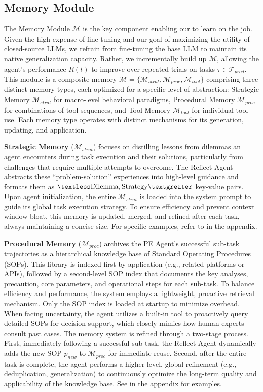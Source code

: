 \subsection{Memory Module}
\label{sec:memory}


The Memory Module $\mathcal{M}$ is the key component enabling our {\method} to learn on the job. 
{Given the high expense of fine-tuning and our goal of maximizing the utility of closed-source LLMs, we refrain from fine-tuning the base LLM to maintain its native generalization capacity. Rather, we incrementally build up $\mathcal{M}$, allowing the agent’s performance $R(t)$ to improve over repeated trials on tasks $\tau \in \mathcal{T}_{prod}$.}
This module is a composite memory $\mathcal{M} = \{\mathcal{M}_{strat}, \mathcal{M}_{proc}, \mathcal{M}_{tool}\}$ comprising three distinct memory types, each optimized for a specific level of abstraction: Strategic Memory $\mathcal{M}_{strat}$ for macro-level behavioral paradigms, Procedural Memory $\mathcal{M}_{proc}$ for combinations of tool sequences, and Tool Memory $\mathcal{M}_{tool}$ for individual tool use. Each memory type operates with distinct mechanisms for its generation, updating, and application.

\textbf{Strategic Memory} ($\mathcal{M}_{strat}$) focuses on distilling lessons from dilemmas an agent encounters during task execution and their solutions, particularly from challenges that require multiple attempts to overcome. The Reflect Agent abstracts these ``problem-solution'' experiences into high-level guidance and formats them as $\textless \text{Dilemma}, \text{Strategy} \textgreater$ key-value pairs. Upon agent initialization, the entire $\mathcal{M}_{strat}$ is loaded into the system prompt to guide its global task execution strategy. To ensure efficiency and prevent context window bloat, this memory is updated, merged, and refined after each task, always maintaining a concise size. For specific examples, refer to  in the appendix.

\textbf{Procedural Memory} ($\mathcal{M}_{proc}$) archives the PE Agent's successful sub-task trajectories as a hierarchical knowledge base of Standard Operating Procedures (SOPs). This library is indexed first by application (e.g., related platforms or APIs), followed by a second-level SOP index that documents the key analyses, precaution, core parameters, and operational steps for each sub-task.
To balance efficiency and performance, the system employs a lightweight, proactive retrieval mechanism. Only the SOP index is loaded at startup to minimize overhead. When facing uncertainty, the agent utilizes a built-in tool to proactively query detailed SOPs for decision support, which closely mimics how human experts consult past cases. The memory system is refined through a two-stage process. First, immediately following a successful sub-task, the Reflect Agent dynamically adds the new SOP $p_{new}$ to $\mathcal{M}_{proc}$ for immediate reuse. Second, after the entire task is complete, the agent performs a higher-level, global refinement (e.g., deduplication, generalization) to continuously optimize the long-term quality and applicability of the knowledge base.
See  in the appendix for examples.

